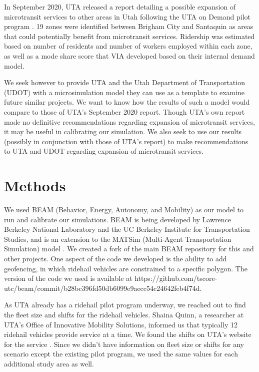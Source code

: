 \documentclass[3p, authoryear]{elsarticle} %
\begin{document}
In September 2020, UTA released a report detailing a possible expansion of microtransit services to other areas in Utah following the UTA on Demand pilot program \citep{UTAreport}.
19 zones were identified between Brigham City and Santaquin as areas that could potentially benefit from microtransit services.
Ridership was estimated based on number of residents and number of workers employed within each zone, as well as a mode share score that VIA developed based on their internal demand model.

We seek however to provide UTA and the Utah Department of Transportation (UDOT) with a microsimulation model they can use as a template to examine future similar projects.
We want to know how the results of such a model would compare to those of UTA's September 2020 report.
Though UTA's own report made no definitive recommendations regarding expansion of microtransit services, it may be useful in calibrating our simulation.
We also seek to use our results (possibly in conjunction with those of UTA's report) to make recommendations to UTA and UDOT regarding expansion of microtransit services.

\hypertarget{methods}{%
\section{Methods}\label{methods}}

We used BEAM (Behavior, Energy, Autonomy, and Mobility) as our model to run and calibrate our simulations. BEAM is being developed by Lawrence Berkeley National Laboratory and the UC Berkeley Institute for Transportation Studies, and is an extension to the MATSim (Multi-Agent Transportation Simulation) model \citep{beamdocs}. We created a fork of the main BEAM repository for this and other projects. One aspect of the code we developed is the ability to add geofencing, in which ridehail vehicles are constrained to a specific polygon. The version of the code we used is available at https://github.com/tscore-utc/beam/commit/b28bc396fd50db6099e9aecc54c24642feb4f74d.

As UTA already has a ridehail pilot program underway, we reached out to find the fleet size and shifts for the ridehail vehicles. Shaina Quinn, a researcher at UTA's Office of Innovative Mobility Solutions, informed us that typically 12 ridehail vehicles provide service at a time. We found the shifts on UTA's website for the service \citep{SLCSouth}. Since we didn't have information on fleet size or shifts for any scenario except the existing pilot program, we used the same values for each additional study area as well.
\end{document}

